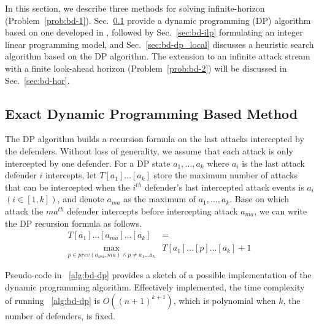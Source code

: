 In this section, we describe three methods for solving infinite-horizon \prob (Problem~\ref{prob:bd-1}).
Sec.~\ref{sec:bd-dp} provide a dynamic programming (DP) algorithm based on one developed in \cite{adler2022role}, 
followed by Sec.~\ref{sec:bd-ilp} formulating an integer linear programming model,
and Sec.~\ref{sec:bd-dp_local} discusses a heuristic search algorithm based on the DP algorithm. 
The extension to an infinite attack stream with a finite look-ahead horizon  (Problem~\ref{prob:bd-2}) will be discussed in Sec.~\ref{sec:bd-hor}.


\subsection{Exact Dynamic Programming Based Method}%
\label{sec:bd-dp}

The DP algorithm builds a recursion formula on the last attacks intercepted by the defenders.
Without loss of generality, we assume that each attack is only intercepted by one defender.
For a DP state $a_1, \dots, a_k$ where $a_i$ is the last attack defender $i$ intercepts, 
let $T[a_1]\dots[a_k]$ store the maximum number of attacks that can be intercepted when the $i^{th}$ defender's last intercepted attack events is $a_i$ $(i\in[1,k])$,
and denote $a_{ma}$ as the maximum of $a_1, \dots, a_k$.
Base on which attack the $ma^{th}$ defender intercepts before intercepting attack $a_{ma}$,
we can write the DP recursion formula as follows.
\begin{equation}
\begin{split}
T[a_1]\dots[a_{ma}]\dots[a_k] &= \\ 
\max_{p\in prev(a_{ma}, ma) \wedge p\neq a_1 \dots a_k} &  T[a_1]\dots[p]\dots[a_k] + 1
\end{split}
\end{equation}

Pseudo-code in ~\ref{alg:bd-dp} provides a sketch of a possible implementation of the dynamic programming algorithm.
Effectively implemented, the time complexity of running ~\ref{alg:bd-dp} is $O( (n+1)^{k+1})$, which is polynomial when $k$, the number of defenders, is fixed.
\vspace{-2mm}

